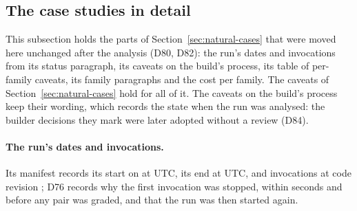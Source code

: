 \subsection{The case studies in detail}
\label{app:natural-cases}
This subsection holds the parts of Section~\ref{sec:natural-cases} that were moved here unchanged after the
analysis (D80, D82): the run's dates and invocations from its status paragraph, its caveats on the build's process,
its table of per-family caveats, its family paragraphs and the cost per family. The caveats of
Section~\ref{sec:natural-cases} hold for all of it. The caveats on the build's process keep their wording, which
records the state when the run was analysed: the builder decisions they mark were later adopted without a review
(D84).

\paragraph{The run's dates and invocations.}
Its manifest records its start on  at  UTC, its end at  UTC, and
 invocations at code revision \texttt{}; D76 records why the first invocation was
stopped, within seconds and before any pair was graded, and that the run was then started again.

